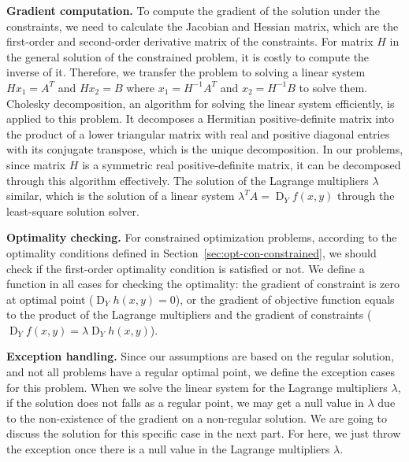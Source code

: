 \par \textbf{Gradient computation.}
To compute the gradient of the solution under the constraints, we need to calculate the Jacobian and Hessian matrix, which are the first-order and second-order derivative matrix of the constraints. For matrix $H$ in the general solution of the constrained problem, it is costly to compute the inverse of it. Therefore, we transfer the problem to solving a linear system $Hx_1 = A^T$ and $Hx_2 = B$ where $x_1 = H^{-1}A^T$ and $x_2 = H^{-1}B$ to solve them. Cholesky decomposition, an algorithm for solving the linear system efficiently, is applied to this problem. It decomposes a Hermitian positive-definite matrix into the product of a lower triangular matrix with real and positive diagonal entries with its conjugate transpose, which is the unique decomposition. In our problems, since matrix $H$ is a symmetric real positive-definite matrix, it can be decomposed through this algorithm effectively. The solution of the Lagrange multipliers $\lambda$ similar, which is the solution of a linear system $\lambda^T A = \operatorname{D}_Yf(x,y)$ through the least-square solution solver. 
\par \textbf{Optimality checking.} For constrained optimization problems, according to the optimality conditions defined in Section~\ref{sec:opt-con-constrained}, we should check if the first-order optimality condition is satisfied or not. We define a function in all cases for checking the optimality: the gradient of constraint is zero at optimal point ($\operatorname{D}_Yh(x,y) = 0$), or the gradient of objective function equals to the product of the Lagrange multipliers and the gradient of constraints ($\operatorname{D}_Yf(x, y) = \lambda \operatorname{D}_Yh(x, y)$). 

\par \textbf{Exception handling.}
Since our assumptions are based on the regular solution, and not all problems have a regular optimal point, we define the exception cases for this problem. When we solve the linear system for the Lagrange multipliers $\lambda$, if the solution does not falls as a regular point, we may get a null value in $\lambda$ due to the non-existence of the gradient on a non-regular solution. We are going to discuss the solution for this specific case in the next part. For here, we just throw the exception once there is a null value in the Lagrange multipliers $\lambda$. 

